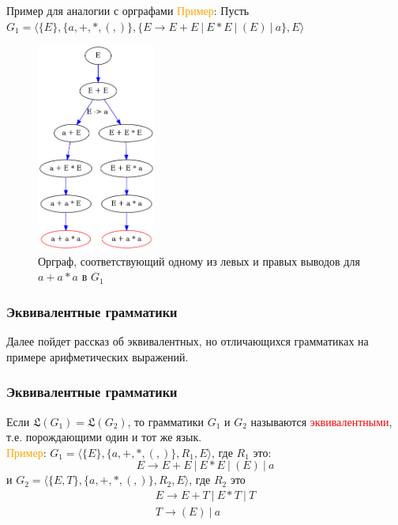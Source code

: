 \documentclass{beamer}
\begin{document}
	\begin{frame}{Пример для аналогии с орграфами}
	   \textcolor{orange}{Пример}: Пусть $G_1=\langle\{E\}, \{a,+,*,(,)\}, \{E \to E + E \  |\ E * E\ |\ ( E ) \ |\  a\}, E\rangle$
          \begin{figure}[!tbp]
          \centering
            \includegraphics[width=0.35\textwidth]{orgraph_ex.png}
          \caption{Орграф, соответствующий одному из левых и правых выводов для $a+a*a$ в $G_1$}
        \end{figure}
	\end{frame}
	
	
	\begin{frame}
    \frametitle{Эквивалентные грамматики}
        Далее пойдет рассказ об эквивалентных, но отличающихся грамматиках на примере арифметических выражений.
	\end{frame}
	
	\begin{frame}
    \frametitle{Эквивалентные грамматики}
         Если $\mathfrak{L}(G_1)=\mathfrak{L}(G_2)$, то грамматики $G_1$ и $G_2$ называются \textcolor{red}{эквивалентными}, т.е. порождающими один и тот же язык.\\
         \vspace{3mm}
         \textcolor{orange}{Пример}: $G_1=\langle\{E\}, \{a,+,*,(,)\}, R_1, E\rangle$, где $R_1$ это: 
         $$
         E \to E + E \  |\ E * E\ |\ ( E ) \ |\  a
         $$
         и $G_2=\langle\{E,T\}, \{a,+,*,(,)\}, R_2, E\rangle$, где $R_2$ это
        \begin{gather}
         E \to E + T \  |\ E * T\ |\ T \nonumber \\
         T \to (E) \ |\  a  \nonumber
        \end{gather}
         
	\end{frame}
	
\end{document}
